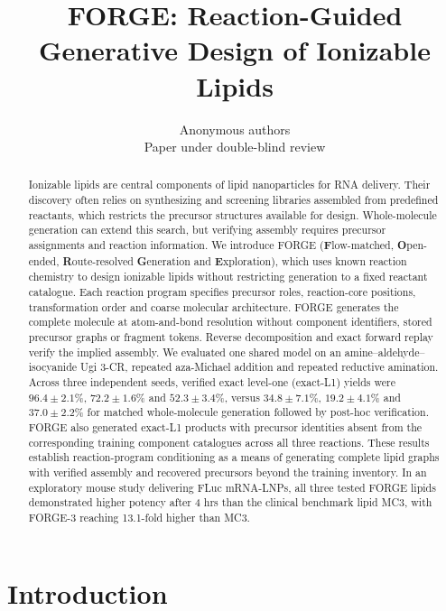 \documentclass{article}
\title{FORGE: Reaction-Guided Generative Design of Ionizable Lipids}
\author{Anonymous authors\\Paper under double-blind review}
\theoremstyle{definition}
\newcommand{\ForgeTableOneConditionedBLYield}{$72.2\pm1.6$}
\newcommand{\ForgeTableOneConditionedLXYield}{$52.3\pm3.4$}
\newcommand{\ForgeTableOneConditionedUgiYield}{$96.4\pm2.1$}
\newcommand{\ForgeTableOneNullBLYield}{$19.2\pm4.1$}
\newcommand{\ForgeTableOneNullLXYield}{$37.0\pm2.2$}
\newcommand{\ForgeTableOneNullUgiYield}{$34.8\pm7.1$}
\begin{document}
\maketitle

\begin{abstract}
Ionizable lipids are central components of lipid nanoparticles for RNA delivery. Their discovery
often relies on synthesizing and screening libraries assembled from predefined reactants, which
restricts the precursor structures available for design. Whole-molecule generation can extend
this search, but verifying assembly requires precursor assignments and reaction information.
We introduce FORGE (\textbf{F}low-matched, \textbf{O}pen-ended,
\textbf{R}oute-resolved \textbf{G}eneration and \textbf{E}xploration), which uses known reaction chemistry to design ionizable lipids without restricting
generation to a fixed reactant catalogue. Each reaction program specifies precursor roles,
reaction-core positions, transformation order and coarse molecular architecture. FORGE generates
the complete molecule at atom-and-bond resolution without component identifiers, stored precursor
graphs or fragment tokens. Reverse decomposition and exact forward replay verify the implied
assembly. We evaluated one shared model on an
amine--aldehyde--isocyanide Ugi 3-CR, repeated aza-Michael addition and repeated reductive amination.
Across three independent seeds, verified exact level-one (exact-L1) yields were
\ForgeTableOneConditionedUgiYield\%, \ForgeTableOneConditionedBLYield\% and
\ForgeTableOneConditionedLXYield\%, versus \ForgeTableOneNullUgiYield\%,
\ForgeTableOneNullBLYield\% and \ForgeTableOneNullLXYield\% for matched whole-molecule generation
followed by post-hoc verification. FORGE also generated exact-L1 products with precursor identities absent from the
corresponding training component catalogues across all three reactions. These results establish
reaction-program conditioning as a means of generating complete lipid graphs with verified assembly
and recovered precursors beyond the training inventory. In an exploratory mouse study delivering FLuc mRNA-LNPs, all three tested
FORGE lipids demonstrated higher potency after 4 hrs than the clinical benchmark lipid MC3,
with FORGE-3 reaching 13.1-fold higher than MC3.
\end{abstract}

\section{Introduction}
\end{document}
